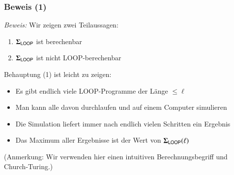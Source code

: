 \documentclass[onlymath]{beamer}
\begin{document}
\begin{frame}[t]\frametitle{Beweis (1)}

\pause

\emph{Beweis:} Wir zeigen zwei Teilaussagen:

\begin{enumerate}[(1)]
\item $\boldsymbol{\Sigma}_{\textsf{LOOP}}$ ist berechenbar
\item $\boldsymbol{\Sigma}_{\textsf{LOOP}}$ ist nicht LOOP-berechenbar
\end{enumerate}\pause\medskip

Behauptung (1) ist leicht zu zeigen:
\begin{itemize}
\item Es gibt endlich viele LOOP-Programme der Länge $\leq \ell$
\item Man kann alle davon durchlaufen und auf einem Computer simulieren
\item Die Simulation liefert immer nach endlich vielen Schritten ein Ergebnis
\item Das Maximum aller Ergebnisse ist der Wert von $\boldsymbol{\Sigma}_{\textsf{LOOP}}(\ell)$
\end{itemize}
{\footnotesize (Anmerkung: Wir verwenden hier einen intuitiven Berechnungsbegriff und Church-Turing.)
}

\end{frame}
\end{document}
